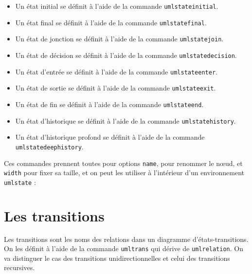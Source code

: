 \documentclass[a4paper,11pt]{report}
\newcommand{\inputTikZ}[1]{%
  }%
\newcommand{\inputTikZ}[1]{%
    \texttt{[image: fig/\#1.pdf]}%
  }%
\begin{document}
\begin{itemize}
\item Un état initial se définit à l'aide de la commande {\tt umlstateinitial}.
\item Un état final se définit à l'aide de la commande {\tt umlstatefinal}.
\item Un état de jonction se définit à l'aide de la commande {\tt umlstatejoin}.
\item Un état de décision se définit à l'aide de la commande {\tt umlstatedecision}.
\item Un état d'entrée se définit à l'aide de la commande {\tt umlstateenter}.
\item Un état de sortie se définit à l'aide de la commande {\tt umlstateexit}.
\item Un état de fin se définit à l'aide de la commande {\tt umlstateend}.
\item Un état d'historique se définit à l'aide de la commande {\tt umlstatehistory}.
\item Un état d'historique profond se définit à l'aide de la commande {\tt umlstatedeephistory}.
\end{itemize}

\medskip

Ces commandes prennent toutes pour options {\tt name}, pour renommer le n\oe{}ud, et {\tt width} pour fixer sa taille, et on peut les utiliser à l'intérieur d'un environnement {\tt umlstate} :

\medskip

\begin{minipage}{0.51\textwidth}

\end{minipage}
\begin{minipage}{0.49\textwidth}
\begin{center}
\inputTikZ{figure54}
\end{center}
\end{minipage}

\medskip

\section{Les transitions}\label{s.trans}

Les transitions sont les noms des relations dans un diagramme d'états-transitions. On les définit à l'aide de la commande {\tt umltrans} qui dérive de {\tt umlrelation}. On va distinguer le cas des transitions unidirectionnelles et celui des transitions recursives.
\end{document}
